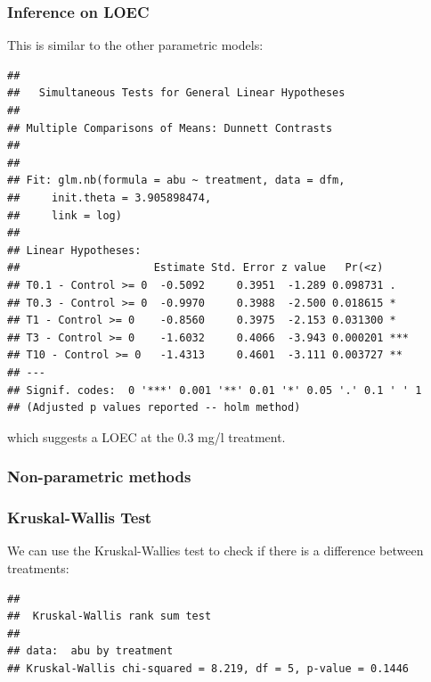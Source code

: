 \subsubsection{Inference on LOEC}
This is similar to the other parametric models:
\begin{knitrout}
\color{fgcolor}\small\begin{kframe}
\begin{alltt}
\hlstd{(}  \hlstd{=} \hlstd{(} \hlstd{=} \hlstd{),}  
             \hlstd{=} \hlstd{),}
             \hlstd{=} \hlstd{(}\hlstd{))}
\end{alltt}
\begin{verbatim}
## 
## 	 Simultaneous Tests for General Linear Hypotheses
## 
## Multiple Comparisons of Means: Dunnett Contrasts
## 
## 
## Fit: glm.nb(formula = abu ~ treatment, data = dfm, 
##     init.theta = 3.905898474, 
##     link = log)
## 
## Linear Hypotheses:
##                     Estimate Std. Error z value   Pr(<z)    
## T0.1 - Control >= 0  -0.5092     0.3951  -1.289 0.098731 .  
## T0.3 - Control >= 0  -0.9970     0.3988  -2.500 0.018615 *  
## T1 - Control >= 0    -0.8560     0.3975  -2.153 0.031300 *  
## T3 - Control >= 0    -1.6032     0.4066  -3.943 0.000201 ***
## T10 - Control >= 0   -1.4313     0.4601  -3.111 0.003727 ** 
## ---
## Signif. codes:  0 '***' 0.001 '**' 0.01 '*' 0.05 '.' 0.1 ' ' 1
## (Adjusted p values reported -- holm method)
\end{verbatim}
\end{kframe}
\end{knitrout}
which suggests a LOEC at the 0.3 mg/l treatment.


\subsubsection{Non-parametric methods}
\subsubsection{Kruskal-Wallis Test}
We can use the Kruskal-Wallies test to check if there is a difference between treatments:

\begin{knitrout}
\color{fgcolor}\small\begin{kframe}
\begin{alltt}
 \hlopt{~}   
\end{alltt}
\begin{verbatim}
## 
## 	Kruskal-Wallis rank sum test
## 
## data:  abu by treatment
## Kruskal-Wallis chi-squared = 8.219, df = 5, p-value = 0.1446
\end{verbatim}
\end{kframe}
\end{knitrout}


